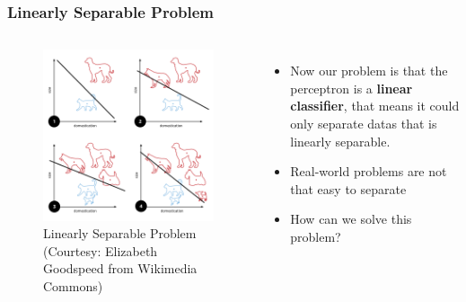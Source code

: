 \documentclass[aspectratio=169]{beamer}
\begin{document}
\begin{frame}
	\frametitle{Linearly Separable Problem}
	\begin{columns}
		\begin{figure}
			\includegraphics[width=0.7\linewidth,height=0.7\textheight,keepaspectratio]{imgs/linsep.png}
			\caption{Linearly Separable Problem (Courtesy: Elizabeth Goodspeed from Wikimedia Commons)}
		\end{figure}
		\begin{itemize}
			\item Now our problem is that the perceptron is a \textbf{linear classifier}, that means it could only separate datas that is linearly separable.
			\item Real-world problems are not that easy to separate
			\item How can we solve this problem?
		\end{itemize}
	\end{columns}
\end{frame}
\end{document}
